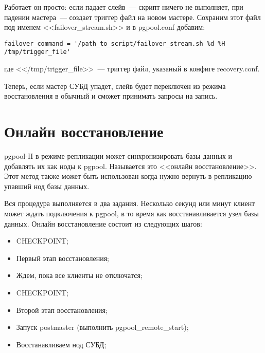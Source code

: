Работает он просто: если падает слейв~--- скрипт ничего не выполняет, при падении мастера~---
создает триггер файл на новом мастере. Сохраним этот файл под именем <<failover\_stream.sh>> и
в pgpool.conf добавим:
\begin{lstlisting}[label=lst:pgpool41,caption=Что выполнять при падении нода]
failover_command = '/path_to_script/failover_stream.sh %d %H /tmp/trigger_file'
\end{lstlisting}
где <</tmp/trigger\_file>>~--- триггер файл, указаный в конфиге recovery.conf.

Теперь, если мастер СУБД упадет, слейв будет переключен из режима восстановления в обычный и сможет принимать запросы на запись.

\section{Онлайн восстановление}
pgpool-II в режиме репликации может синхронизировать базы данных и добавлять их как ноды к pgpool.
Называется это <<онлайн восстановление>>. Этот метод также может быть использован когда нужно вернуть
в репликацию упавший нод базы данных.

Вся процедура выполняется в два задания. Несколько секунд или минут клиент может ждать подключения к pgpool,
в то время как восстанавливается узел базы данных. Онлайн восстановление состоит из следующих шагов:
\begin{itemize}
\item CHECKPOINT;
\item Первый этап восстановления;
\item Ждем, пока все клиенты не отключатся;
\item CHECKPOINT;
\item Второй этап восстановления;
\item Запуск postmaster (выполнить pgpool\_remote\_start);
\item Восстанавливаем нод СУБД;
\end{itemize}

